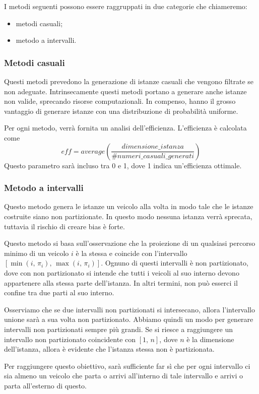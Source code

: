 \documentclass[../../main.tex]{subfiles}
\begin{document}
I metodi seguenti possono essere raggruppati in due categorie che chiameremo:
\begin{itemize}
    \item metodi casuali;
    \item metodo a intervalli.
\end{itemize}

\subsubsection{Metodi casuali}
Questi metodi prevedono la generazione di istanze casuali che vengono filtrate se non adeguate.
Intrinsecamente questi metodi portano a generare anche istanze non valide, sprecando risorse computazionali.
In compenso, hanno il grosso vantaggio di generare istanze con una distribuzione di probabilità uniforme.

Per ogni metodo, verrà fornita un analisi dell'efficienza.
L'efficienza è calcolata come
\[ eff = average\left(\frac{dimensione\_istanza}{\#numeri\_casuali\_generati}\right) \]
Questo parametro sarà incluso tra 0 e 1, dove 1 indica un'efficienza ottimale.

\subsubsection{Metodo a intervalli}
Questo metodo genera le istanze un veicolo alla volta in modo tale che le istanze costruite siano non partizionate.
In questo modo nessuna istanza verrà sprecata, tuttavia il rischio di creare bias è forte.

Questo metodo si basa sull'osservazione che la proiezione di un qualsiasi percorso minimo di un veicolo $i$ è la stessa e coincide con l'intervallo $[\min(i,\, \pi_i),\, \max(i,\, \pi_i)]$.
Ognuno di questi intervalli è non partizionato, dove con non partizionato si intende che tutti i veicoli al suo interno devono appartenere alla stessa parte dell'istanza.
In altri termini, non può esserci il confine tra due parti al suo interno.

Osserviamo che se due intervalli non partizionati si intersecano, allora l'intervallo unione sarà a sua volta non partizionato.
Abbiamo quindi un modo per generare intervalli non partizionati sempre più grandi.
Se si riesce a raggiungere un intervallo non partizionato coincidente con $[1,\, n]$, dove $n$ è la dimensione dell'istanza, allora è evidente che l'istanza stessa non è partizionata.

Per raggiungere questo obiettivo, sarà sufficiente far sì che per ogni intervallo ci sia almeno un veicolo che parta o arrivi all'interno di tale intervallo e arrivi o parta all'esterno di questo.
\end{document}
